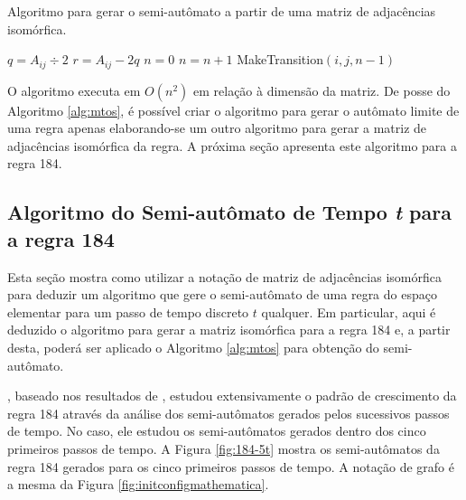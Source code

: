 \documentclass[12pt,a4paper]{article}
\begin{document}
\begin{algorithm}
\caption{Algoritmo para gerar o semi-autômato a partir de uma matriz de
adjacências isomórfica.}
\label{alg:mtos}
\begin{algorithmic}
\REPEAT
\STATE $q = A_{ij} \div 2$
\STATE $r = A_{ij}-2q$ 
\STATE $n=0$
\STATE $n=n+1$
\ENDWHILE
\STATE MakeTransition$(i,j,n-1)$
\ENDIF
{}
\ENDIF
\ENDFOR
\ENDFOR
\end{algorithmic}
\end{algorithm}

O algoritmo executa em $O(n^2)$ em relação à dimensão da matriz.
De posse do Algoritmo \ref{alg:mtos}, é possível criar o algoritmo para gerar o
autômato limite de uma regra apenas elaborando-se um outro algoritmo para gerar a
matriz de adjacências isomórfica da regra. A próxima seção apresenta este
algoritmo para a regra 184.

\subsection{Algoritmo do Semi-autômato de Tempo \emph{t} para a regra 184}\label{sec:184}

Esta seção mostra como utilizar a notação de matriz de adjacências
isomórfica para deduzir um algoritmo que gere o semi-autômato de uma
regra do espaço elementar para um passo de tempo discreto $t$ qualquer. Em
particular, aqui é deduzido o algoritmo para gerar a matriz isomórfica para
a regra 184 e, a partir desta, poderá ser aplicado o Algoritmo \ref{alg:mtos}
para obtenção do semi-autômato.

, baseado nos resultados de ,
estudou extensivamente o padrão de crescimento da regra 184 através da análise
dos semi-autômatos gerados pelos sucessivos passos de tempo. No caso, ele estudou
os semi-autômatos gerados dentro dos cinco primeiros passos de tempo. A Figura
\ref{fig:184-5t} mostra os semi-autômatos da regra 184 gerados para os cinco
primeiros passos de tempo. A notação de grafo é a mesma da Figura
\ref{fig:initconfigmathematica}.
\end{document}
